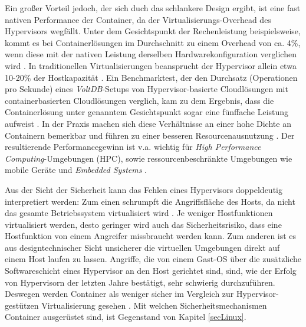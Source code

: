 \documentclass[../main.tex]{subfiles}
\begin{document}
			Ein großer Vorteil jedoch, der sich duch das schlankere Design ergibt, ist eine fast nativen Performance \cite[S.1]{containerVirtPerformance} der Container, da der Virtualisierungs-Overhead des Hypervisors wegfällt. Unter dem Gesichtspunkt der Rechenleistung beispielsweise, kommt es bei Containerlösungen im Durchschnitt zu einem Overhead von ca. 4\%, wenn diese mit der nativen Leistung derselben Hardwarekonfiguration verglichen wird \cite[S.4]{containerVirtPerformance}\cite[S.5]{IBMcontVMcomparison}. In traditionellen Virtualisierungen beansprucht der Hypervisor allein etwa 10-20\% der Hostkapazität \cite[S.2]{dockerIntroIEEE}\cite[S.5]{IBMcontVMcomparison}. Ein Benchmarktest, der den Durchsatz (Operationen pro Sekunde) eines \emph{VoltDB}-Setups\cite{voltdb} von Hypervisor-basierte Cloudlösungen mit containerbasierten \gls{Cloud}lösungen verglich, kam zu dem Ergebnis, dass die Containerlösung unter genanntem Gesichtspunkt sogar eine fünffache Leistung aufweist \cite[S.2+3]{voltdbBenchmark}.
			In der Praxis machen sich diese Verhältnisse an einer hohe Dichte an Containern bemerkbar und führen zu einer besseren Resourcenausnutzung \cite[S.7+8]{dockerBook}. Der resultierende Performancegewinn ist v.a. wichtig für \emph{High Performance Computing}-Umgebungen (\acrshort{HPC}), sowie ressourcenbeschränkte Umgebungen wie mobile Geräte und \emph{Embedded Systems} \cite[S.1]{dockerSec2}.

      Aus der Sicht der Sicherheit kann das Fehlen eines Hypervisors doppeldeutig interpretiert werden: Zum einen schrumpft die Angriffsfläche des Hosts, da nicht das gesamte Betriebssystem virtualisiert wird \cite[S.6]{dockerBook}. Je weniger Hostfunktionen virtualisiert werden, desto geringer wird auch das Sicherheitsrisiko, dass eine Hostfunktion von einem Angreifer missbraucht werden kann. Zum anderen ist es aus designtechnischer Sicht unsicherer die virtuellen Umgebungen direkt auf einem Host laufen zu lassen. Angriffe, die von einem Gast-\acrshort{OS} über die zusätzliche Softwareschicht eines Hypervisor an den Host gerichtet sind, sind, wie der Erfolg von Hypervisorn der letzten Jahre bestätigt, sehr schwierig durchzuführen.
			Deswegen werden Container als weniger sicher im Vergleich zur Hypervisor-gestützen Virtualisierung gesehen \cite[S.6]{dockerBook}. Mit welchen Sicherheitsmechanismen Container ausgerüstet sind, ist Gegenstand von Kapitel \ref{secLinux}.
\end{document}
